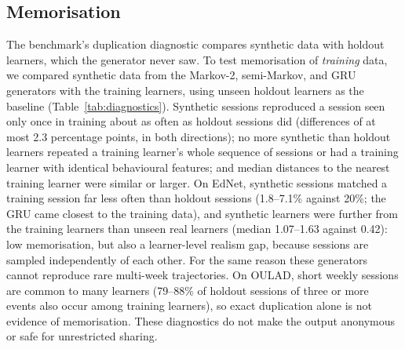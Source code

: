 \documentclass[preprint,12pt]{elsarticle}
\begin{document}
\subsection{Memorisation}
The benchmark's duplication diagnostic compares synthetic data with holdout
learners, which the generator never saw. To test memorisation of
\emph{training} data, we compared synthetic data from the Markov-2,
semi-Markov, and GRU generators with the training learners, using unseen holdout
learners as the baseline (Table~\ref{tab:diagnostics}). Synthetic sessions
reproduced a session seen only once in training about as often as holdout
sessions did (differences of at most 2.3 percentage points, in both
directions); no more synthetic than holdout learners repeated a training
learner's whole sequence of sessions or had a training learner with
identical behavioural features; and median distances to the nearest training
learner were similar or larger. On EdNet, synthetic sessions matched a
training session far less often than holdout sessions (1.8--7.1\% against
20\%; the GRU came closest to the training data), and synthetic learners were
further from the training learners than unseen real learners (median
1.07--1.63 against 0.42): low memorisation, but also a learner-level realism
gap, because sessions are sampled independently of each other. For the same reason these generators cannot reproduce rare
multi-week trajectories. On OULAD, short weekly sessions are common to many
learners (79--88\% of holdout sessions of three or more events also occur
among training learners), so exact duplication alone is not evidence of
memorisation. These diagnostics do not make the output anonymous or safe for
unrestricted sharing.

\begin{table}[t]
\centering
\caption{Stability, memorisation, and detection diagnostics (ranges over
OULAD modules and over the Markov-2, semi-Markov, and GRU generators). ARI: adjusted Rand index
(1~=~identical partitions, 0~=~chance). Memorisation rows compare with the
training learners; ``holdout'' is the baseline of unseen real learners.}
\label{tab:diagnostics}
\resizebox{\linewidth}{!}{}
\end{table}
\end{document}
